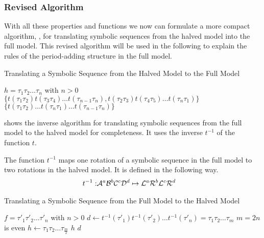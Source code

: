 \subsubsection{Revised Algorithm}

With all these properties and functions we now can formulate a more compact algorithm, , for translating symbolic sequences from the halved model into the full model.
This revised algorithm will be used in the following to explain the rules of the period-adding structure in the full model.

\begin{algorithm}
    \caption{Translating a Symbolic Sequence from the Halved Model to the Full Model}\label{alg:halved.to.full}
    \begin{algorithmic}
        \Require $h = \tau_1\tau_2 \dots \tau_n$ with $n > 0$
        \State \Return $\{t(\tau_1\tau_2) t(\tau_3\tau_4) \dots t(\tau_{n-1}\tau_n), t(\tau_2\tau_3) t(\tau_4\tau_5) \dots t(\tau_n\tau_1)\}$
        \State \Return $\{t(\tau_1\tau_2) \dots t(\tau_{n}\tau_1) \dots t(\tau_{n-1}\tau_n)\}$
        \EndIf
    \end{algorithmic}
\end{algorithm}

 shows the inverse algorithm for translating symbolic sequences from the full model to the halved model for completeness.
It uses the inverse $t^{-1}$ of the function $t$.

\begin{definition}
    The function $t^{-1}$ maps one rotation of a symbolic sequence in the full model to two rotations in the halved model.
    It is defined in the following way.
    \begin{align}
        t^{-1}: & \mathcal{A}^a\mathcal{B}^b\mathcal{C}^c\mathcal{D}^d \mapsto \mathcal{L}^a\mathcal{R}^b\mathcal{L}^c\mathcal{R}^d
    \end{align}
\end{definition}

\begin{algorithm}
    \caption{Translating a Symbolic Sequence from the Full Model to the Halved Model}\label{alg:full.to.halved}
    \begin{algorithmic}
        \Require $f = \tau'_1\tau'_2 \dots \tau'_n$ with $n > 0$
        \State $d \gets t^{-1}(\tau'_1)t^{-1}(\tau'_2) \dots t^{-1}(\tau'_n) = \tau_1\tau_2 \dots \tau_m$
        \Comment $m = 2n$ is even
        \State $h \gets \tau_1\tau_2 \dots \tau_{\frac{m}{2}}$
        \State \Return $h$
        \State \Return $d$
        \EndIf
    \end{algorithmic}
\end{algorithm}
